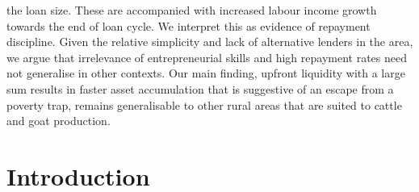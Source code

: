 {the loan size. These are accompanied with increased labour income growth towards the end of loan cycle. We interpret this as evidence of repayment discipline. Given the relative simplicity and lack of alternative lenders in the area, we argue that irrelevance of entrepreneurial skills and high repayment rates need not generalise in other contexts. Our main finding, upfront liquidity with a large sum results in faster asset accumulation that is suggestive of an escape from a poverty trap, remains generalisable to other rural areas that are suited to cattle and goat production.

}

\newpage
\setcounter{tocdepth}{3}
\tableofcontents
\newpage

\setlength{\parindent}{1em}
\vspace{2ex}








\renewcommand{\thefootnote}{*\arabic{footnote}}
\setcounter{footnote}{0}

\section{Introduction}

